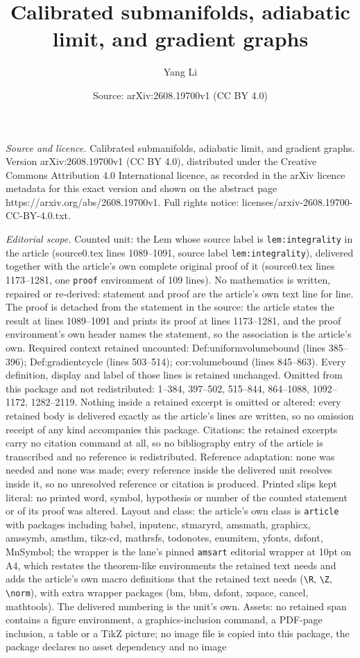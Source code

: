 \documentclass[10pt,a4paper]{amsart}
\title[Calibrated submanifolds, adiabatic limit, and gradient graph]{Calibrated submanifolds, adiabatic limit, and gradient graphs}
\author{Yang Li}
\date{Source: arXiv:2608.19700v1 (CC BY 4.0)}
\begin{document}
\maketitle

\noindent\emph{Source and licence.} Calibrated submanifolds, adiabatic limit, and gradient graphs. Version arXiv:2608.19700v1 (CC BY 4.0), distributed under the Creative Commons Attribution 4.0 International licence, as recorded in the arXiv licence metadata for this exact version and shown on the abstract page https://arxiv.org/abs/2608.19700v1. Full rights notice: licenses/arxiv-2608.19700-CC-BY-4.0.txt.\par\smallskip

\noindent\textit{Editorial scope.} Counted unit: the Lem whose source label is \texttt{lem:integrality} in the article (source0.tex lines 1089--1091, source label \texttt{lem:integrality}), delivered together with the article's own complete original proof of it (source0.tex lines 1173--1281, one \texttt{proof} environment of 109 lines). No mathematics is written, repaired or re-derived: statement and proof are the article's own text line for line. The proof is detached from the statement in the source: the article states the result at lines 1089--1091 and prints its proof at lines 1173--1281, and the proof environment's own header names the statement, so the association is the article's own. Required context retained uncounted: Def:uniformvolumebound (lines 385--396); Def:gradientcycle (lines 503--514); cor:volumebound (lines 845--863). Every definition, display and label of those lines is retained unchanged. Omitted from this package and not redistributed: 1--384, 397--502, 515--844, 864--1088, 1092--1172, 1282--2119. Nothing inside a retained excerpt is omitted or altered: every retained body is delivered exactly as the article's lines are written, so no omission receipt of any kind accompanies this package. Citations: the retained excerpts carry no citation command at all, so no bibliography entry of the article is transcribed and no reference is redistributed. Reference adaptation: none was needed and none was made; every reference inside the delivered unit resolves inside it, so no unresolved reference or citation is produced. Printed slips kept literal: no printed word, symbol, hypothesis or number of the counted statement or of its proof was altered. Layout and class: the article's own class is \texttt{article} with packages including babel, inputenc, stmaryrd, amsmath, graphicx, amssymb, amsthm, tikz-cd, mathrsfs, todonotes, enumitem, yfonts, dsfont, MnSymbol; the wrapper is the lane's pinned \texttt{amsart} editorial wrapper at 10pt on A4, which restates the theorem-like environments the retained text needs and adds the article's own macro definitions that the retained text needs (\texttt{\textbackslash R}, \texttt{\textbackslash Z}, \texttt{\textbackslash norm}), with extra wrapper packages (bm, bbm, dsfont, xspace, cancel, mathtools). The delivered numbering is the unit's own. Assets: no retained span contains a figure environment, a graphics-inclusion command, a PDF-page inclusion, a table or a TikZ picture; no image file is copied into this package, the package declares no asset dependency and no image 
\end{document}
